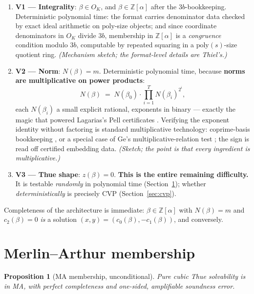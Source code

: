 \documentclass[11pt]{amsart}
\theoremstyle{plain}
\newtheorem{proposition}{Proposition}[section]
\theoremstyle{remark}
\begin{document}
\begin{enumerate}
\item \textbf{V1 --- Integrality}: $\beta \in O_K$, and $\beta \in
  \mathbb{Z}[\alpha]$ after the $3b$-bookkeeping. Deterministic
  polynomial time: the format carries denominator data checked by
  exact ideal arithmetic on $\mathrm{poly}$-size objects; and since
  coordinate denominators in $O_K$ divide $3b$, membership in
  $\mathbb{Z}[\alpha]$ is a \emph{congruence} condition modulo $3b$,
  computable by repeated squaring in a $\mathrm{poly}(s)$-size
  quotient ring. \emph{(Mechanism sketch; the format-level details
  are Thiel's.)}
\item \textbf{V2 --- Norm}: $N(\beta) = m$. Deterministic polynomial
  time, because \textbf{norms are multiplicative on power products}:
  \[
  N(\beta) \;=\; N(\beta_0)\cdot\prod_{i=1}^{T}
  N(\beta_i)^{2^i},
  \]
  each $N(\beta_i)$ a small explicit rational, exponents in binary
  --- exactly the magic that powered Lagarias's Pell certificates
  \cite{Lag79}. Verifying the exponent identity without factoring is
  standard multiplicative technology: coprime-basis bookkeeping
  \cite{vG25}, or a special case of Ge's multiplicative-relation test
  \cite{Ge93}; the sign is read off certified embedding data.
  \emph{(Sketch; the point is that every ingredient is
  multiplicative.)}
\item \textbf{V3 --- Thue shape}: $z(\beta) = 0$. \textbf{This is the
  entire remaining difficulty.} It is testable \emph{randomly} in
  polynomial time (Section~\ref{sec:ma}); whether
  \emph{deterministically} is precisely CVP (Section~\ref{sec:cvp}).
\end{enumerate}

Completeness of the architecture is immediate: $\beta \in
\mathbb{Z}[\alpha]$ with $N(\beta) = m$ and $c_2(\beta) = 0$ \emph{is}
a solution $(x, y) = (c_0(\beta), -c_1(\beta))$, and conversely.

\section{Merlin--Arthur membership}\label{sec:ma}

\begin{proposition}[MA membership, unconditional]\label{prop:ma}
Pure cubic Thue solvability is in MA, with perfect completeness and
one-sided, amplifiable soundness error.
\end{proposition}
\end{document}
